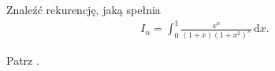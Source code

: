 %

\begin{problem_with_solution}
    \label{valean_1_32}%
    Znaleźć rekurencję, jaką spełnia
    \begin{align}
        I_n = \int_0^1 \frac{x^n}{(1+x)(1+x^2)^n} \,\mathrm{d}x.
    \end{align} 
\end{problem_with_solution}


\begin{solution}
    Patrz \cite[s. 21, 22]{valean19}.
\end{solution}

%